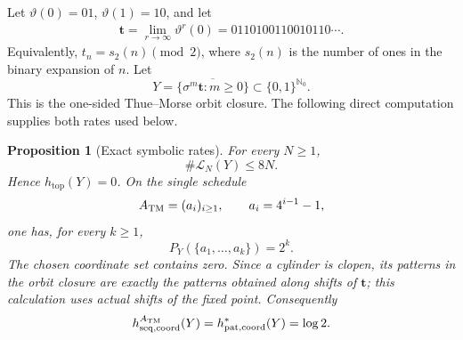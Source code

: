 \documentclass[11pt,reqno]{amsart}
\numberwithin{equation}{section}
\newtheorem{proposition}[theorem]{Proposition}
\theoremstyle{definition}
\newcommand{\Nzero}{\mathbb N_0}
\newcommand{\Lcal}{\mathcal L}
\newcommand{\htop}{h_{\mathrm{top}}}
\begin{document}
Let $\vartheta(0)=01$, $\vartheta(1)=10$, and let
\begin{align*}
 \mathbf t=\lim_{r\to\infty}\vartheta^r(0)
 =0110100110010110\cdots.
\end{align*}
Equivalently, $t_n=s_2(n)\pmod2$, where $s_2(n)$ is the number of ones in
the binary expansion of $n$.  Let
\begin{equation}\label{eq:thue-morse-shift}
 Y=\overline{\{\sigma^m\mathbf t:m\ge0\}}
 \subset\{0,1\}^{\Nzero}.
\end{equation}
This is the one-sided Thue--Morse orbit closure.  The following direct computation supplies both rates used below.

\begin{proposition}[Exact symbolic rates]\label{prop:thue-morse}
For every $N\ge1$,
\begin{equation}\label{eq:TM-linear}
 \#\Lcal_N(Y)\le8N.
\end{equation}
Hence $\htop(Y)=0$.  On the single schedule
\begin{equation}\label{eq:TM-schedule}
 A_{\rm TM}=(a_i)_{i\ge1},
 \qquad a_i=4^{i-1}-1,
\end{equation}
one has, for every $k\ge1$,
\begin{equation}\label{eq:TM-full-pattern}
 P_Y(\{a_1,\ldots,a_k\})=2^k.
\end{equation}
The chosen coordinate set contains zero.  Since a cylinder is clopen, its
patterns in the orbit closure are exactly the patterns obtained along shifts
of $\mathbf t$; this calculation uses actual shifts of the fixed point.  Consequently
\begin{equation}\label{eq:TM-complexities}
 h_{\rm seq,coord}^{A_{\rm TM}}(Y)
 =h_{\rm pat,coord}^*(Y)=\log2.
\end{equation}
\end{proposition}
\end{document}
